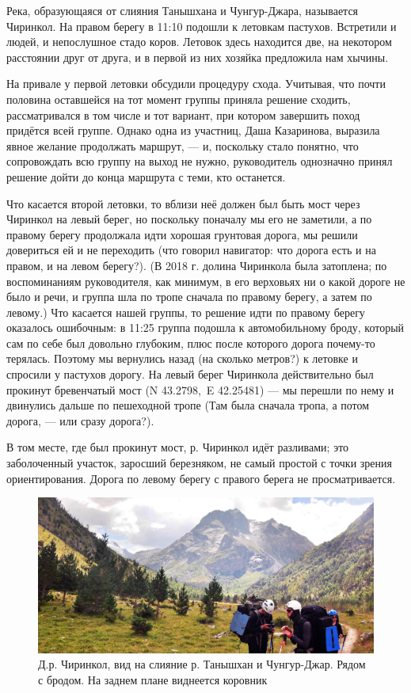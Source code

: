 Река, образующаяся от слияния Танышхана и Чунгур-Джара, называется Чиринкол. На правом берегу в 11:10 подошли к летовкам пастухов. Встретили и людей, и непослушное стадо коров. Летовок здесь находится две, на некотором расстоянии друг от друга, и в первой из них хозяйка предложила нам хычины. 

На привале у первой летовки обсудили процедуру схода. Учитывая, что почти половина оставшейся на тот момент группы приняла решение сходить, рассматривался в том числе и тот вариант, при котором завершить поход придётся всей группе. Однако одна из участниц, Даша Казаринова, выразила явное желание продолжать маршрут, --- и, поскольку стало понятно, что сопровождать всю группу на выход не нужно, руководитель однозначно принял решение дойти до конца маршрута с теми, кто останется.

Что касается второй летовки, то вблизи неё должен был быть мост через Чиринкол на левый берег, но поскольку поначалу мы его не заметили, а по правому берегу продолжала идти хорошая грунтовая дорога, мы решили довериться ей и не переходить \alert{(что говорил навигатор: что дорога есть и на правом, и на левом берегу?)}. (В 2018 г. \cite{Korolyov2018} долина Чиринкола была затоплена; по воспоминаниям руководителя, как минимум, в его верховьях ни о какой дороге не было и речи, и группа шла по тропе сначала по правому берегу, а затем по левому.) Что касается нашей группы, то решение идти по правому берегу оказалось ошибочным: в 11:25 группа подошла к автомобильному броду, который сам по себе был довольно глубоким, плюс после которого дорога почему-то терялась. Поэтому мы вернулись назад \alert{(на сколько метров?)} к летовке и спросили у пастухов дорогу. На левый берег Чиринкола действительно был прокинут бревенчатый мост (N 43.2798\degree,~E 42.25481\degree) --- мы перешли по нему и двинулись дальше по пешеходной тропе \alert{(Там была сначала тропа, а потом дорога, --- или сразу дорога?)}. 

В том месте, где был прокинут мост, р. Чиринкол идёт разливами; это заболоченный участок, заросший березняком, не самый простой с точки зрения ориентирования. Дорога по левому берегу с правого берега не просматривается.

\begin{figure}[h!]
	\centering
	\includegraphics[width=0.7\linewidth]{../pics/DSC_0462 2}
	\caption{Д.р. Чиринкол, вид на слияние р. Танышхан и Чунгур-Джар. Рядом с бродом. На заднем плане виднеется коровник}
	\label{fig:DSC_0462}
\end{figure}

